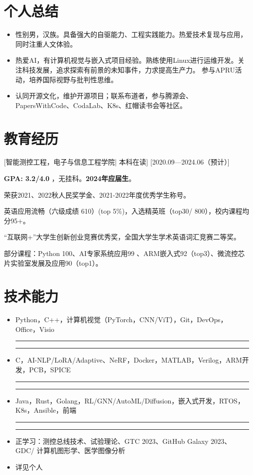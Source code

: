 \documentclass{resume}
\newcommand{\progressbar}[2][2cm]{%
    \textcolor{color1}{\rule{#1 * \real{#2} / 100}{1.5ex}}%
    \textcolor{color2!15}{\rule{#1 - #1 * \real{#2} / 100}{1.5ex}}}
\begin{document}

\ResumeTitle

\section{个人总结}

\begin{itemize}
  \item 性别男，汉族。具备强大的自驱能力、工程实践能力。热爱技术复现与应用，同时注重人文体验。
  \item 热爱AI，有计算机视觉与嵌入式项目经验。熟练使用Linux进行运维开发。关注科技发展，追求探索有前景的未知事件，力求提高生产力。
参与APRU活动，培养国际视野与批判性思维。
  \item 认同开源文化，维护开源项目；联系布道者，参与腾源会、PapersWithCode、CodaLab、K8s、红帽读书会等社区。
\end{itemize}

\section{教育经历}

[\textnormal{智能测控工程，电子与信息工程学院|} 本科在读]
[2020.09—2024.06（预计）]

\textbf{GPA: 3.2/4.0
}，无挂科。\textbf{2024年应届生}。

荣获2021、2022秋人民奖学金、2021-2022年度优秀学生称号。

英语应用流畅（六级成绩 610）(top 5\%)，入选精英班（top30/ 800），校内课程均分95+。

“互联网+”大学生创新创业竞赛优秀奖，全国大学生学术英语词汇竞赛二等奖。

部分课程：Python 100、AI专家系统应用99 、ARM嵌入式92（top3）、微流控芯片实验室发展及应用90（top1）。
%

\section[技术能力]{技术能力}%
\begin{itemize}
\item[] Python，C++，计算机视觉（PyTorch，CNN/ViT），Git，DevOps，Office，Visio \hfill \progressbar{80} 
\item[] C，AI-NLP/LoRA/Adaptive、NeRF，Docker，MATLAB，Verilog，ARM开发，PCB，SPICE\hfill \progressbar{60} 
\item[] Java，Rust，Golang，RL/GNN/AutoML/Diffusion，嵌入式开发，RTOS，K8s，Ansible，前端 \hfill \progressbar{30} 
\item[] 正学习：测控总线技术、试验理论、GTC 2023、GitHub Galaxy 2023、GDC/ 计算机图形学、医学图像分析
\item[] 详见个人
\end{itemize}
\end{document}
